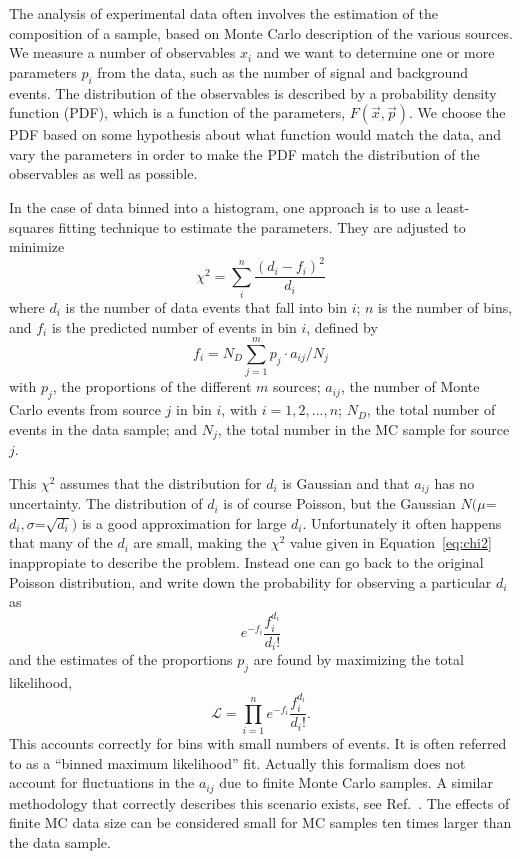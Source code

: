 The analysis of experimental data often involves the estimation of the composition of a sample, based on Monte Carlo description of the various sources. We measure a number of observables $x_i$ and we want to determine one or more parameters $p_i$ from the data, such as the number of signal and background events. The distribution  of the observables is described by a probability density function (PDF), which is a function of %
the parameters, $F(\vec{x},\vec{p})$.  We choose the PDF based on some hypothesis about what function would match the data, and vary the parameters in order to make the PDF match the distribution of the observables as well as possible. 


In the case of data binned into a histogram, one approach is to use a least-squares fitting technique to estimate the parameters. They are adjusted to minimize
%
\begin{equation}
\chi^2 = \sum^n_i \frac{(d_i - f_i)^2}{d_i}
 \label{eq:chi2}
\end{equation}
%
where $d_i$ is the number of data events that fall into bin $i$; $n$ is the number of bins, and $f_i$ is the predicted number of events in bin $i$, defined by
%
\begin{equation}
f_i = N_D\sum^m_{j=1} p_j \cdot a_{ij}/N_j
\end{equation}
%
with $p_j$, the proportions of the different $m$ sources; $a_{ij}$, the number of Monte Carlo events from source $j$ in bin $i$, with $i=1,2,...,n$; $N_D$, the total number of events in the data sample; and $N_j$, the total number in the MC sample for source $j$.

This $\chi^2$ assumes that the distribution for $d_i$ is Gaussian and that $a_{ij}$ has no uncertainty. The distribution of $d_i$ is of course Poisson, but the Gaussian $N(\mu$=$ d_i,\sigma$=$\sqrt{d_i})$ is a good approximation for large  $d_i$.  Unfortunately it often happens that many of the $d_i$ are small, making the $\chi^2$ value given in Equation~\ref{eq:chi2} inappropiate to describe the problem.  Instead one can go back to the original Poisson distribution, and write down the probability for observing a particular $d_i$ as
%
\begin{equation}
e^{-f_i} \frac{f_i^{d_i}}{d_i!} 
\end{equation}
%
and the estimates of the proportions $p_j$ are found by maximizing the total likelihood, 
%
\begin{equation}
\mathcal{L} = \prod^n_{i=1} e^{-f_i} \frac{f_i^{d_i}}{d_i!}.
\end{equation}
%
This accounts correctly for bins with small numbers of events.  It is often referred to as a ``binned maximum likelihood'' fit. Actually this formalism does not account for fluctuations in the $a_{ij}$ due to finite Monte Carlo samples. A similar methodology that correctly describes this scenario exists, see Ref.~\cite{Barlow1993219}. The effects of finite MC data size can be considered small for MC samples ten times larger than the data sample. 


